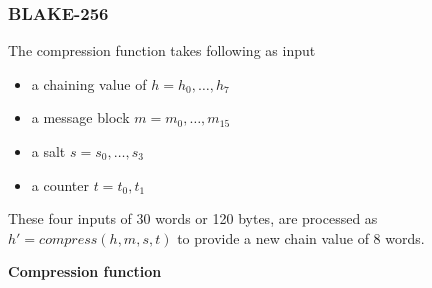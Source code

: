 \documentclass[12pt]{artikel3}                  %
\begin{document}
\subsubsection{ BLAKE-256 }

The compression function takes following as input
\begin{itemize}
  \item a chaining value of $h = h_{0},\dots, h_{7}$
  \item a message block $m = m_{0},\dots, m_{15}$
  \item a salt $s = s_{0},\dots, s_{3}$
  \item a counter $t = t_{0}, t_{1}$
\end{itemize}
These four inputs of 30 words or 120 bytes, are processed as $h' = compress(h, m, s, t)$ to provide a new
chain value of 8 words.

{\bf Compression function}
\end{document}
